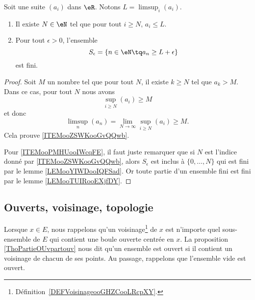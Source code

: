 \begin{lemma}       \label{LEMooHGJVooCbgOEK}
	Soit une suite \( (a_i)\) dans \( \eR\). Notons \( L= \limsup_i(a_i)\).
	\begin{enumerate}
		\item       \label{ITEMooZSWKooGvQQwb}
		      Il existe \( N\in \eN\) tel que pour tout \( i\geq N\), \( a_i\leq L\).
		\item       \label{ITEMooPMHUooIWcqFE}
		      Pour tout \( \epsilon>0\), l'ensemble
		      \begin{equation}
			      S_{\epsilon}=\{ n\in \eN\tq a_n\geq L+\epsilon \}
		      \end{equation}
		      est fini.
	\end{enumerate}
\end{lemma}

\begin{proof}
	Soit \( M\) un nombre tel que pour tout \( N\), il existe \( k\geq N\) tel que \( a_k>M\). Dans ce cas, pour tout \( N\) nous avons
	\begin{equation}
		\sup_{i\geq N}(a_i)\geq M
	\end{equation}
	et donc
	\begin{equation}
		\limsup_n(a_n)=\lim_{N\to \infty}\sup_{i\geq N}(a_i)\geq M.
	\end{equation}
	Cela prouve \ref{ITEMooZSWKooGvQQwb}.

	Pour \ref{ITEMooPMHUooIWcqFE}, il faut juste remarquer que si \( N\) est l'indice donné par \ref{ITEMooZSWKooGvQQwb}, alors \( S_{\epsilon}\) est inclus à \( \{ 0,\ldots, N \}\) qui est fini par le lemme \ref{LEMooYIWDooIQFSad}. Or toute partie d'un ensemble fini est fini par le lemme \ref{LEMooTUIRooEXjfDY}.
\end{proof}

\subsection{Ouverts, voisinage, topologie}

Lorsque \( x\in E\), nous rappelons qu'un voisinage\footnote{Définition~\ref{DEFVoisinageooGHZCooLRcpXY}.} de \( x\) est n'importe quel sous-ensemble de \( E\) qui contient une boule ouverte centrée en \( x\). La proposition \ref{ThoPartieOUvpartouv} nous dit qu'un ensemble est ouvert si il contient un voisinage de chacun de ses points. Au passage, rappelons que l'ensemble vide est ouvert.

